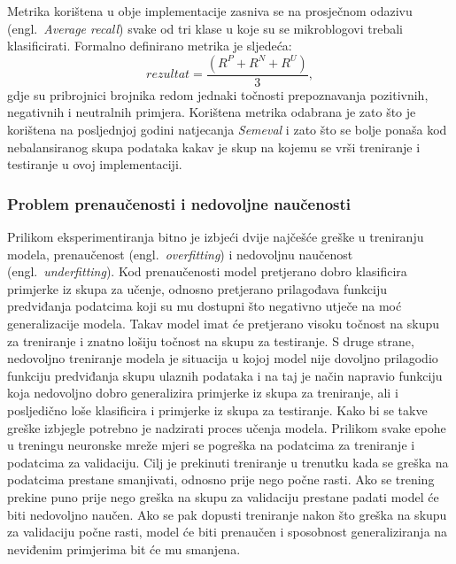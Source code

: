 \documentclass[times, utf8, zavrsni]{fer}
\begin{document}
Metrika korištena u obje implementacije zasniva se na prosječnom odazivu (engl.~\emph{Average recall}) svake od tri klase u koje su se mikroblogovi trebali klasificirati. Formalno definirano metrika je sljedeća: \[ \mathit{rezultat} = \frac{(R^P + R^N + R^U)}{3},\] gdje su pribrojnici brojnika redom jednaki točnosti prepoznavanja pozitivnih, negativnih i neutralnih primjera. Korištena metrika odabrana je zato što je korištena na posljednjoj godini natjecanja \emph{Semeval} i zato što se bolje ponaša kod nebalansiranog skupa podataka kakav je skup na kojemu se vrši treniranje i testiranje u ovoj implementaciji.

\subsubsection{Problem prenaučenosti i nedovoljne naučenosti}

Prilikom eksperimentiranja bitno je izbjeći dvije najčešće greške u treniranju modela, prenaučenost (engl.~\emph{overfitting}) i nedovoljnu naučenost (engl.~\emph{underfitting}). Kod prenaučenosti model pretjerano dobro klasificira primjerke iz skupa za učenje, odnosno pretjerano prilagođava funkciju predviđanja podatcima koji su mu dostupni što negativno utječe na moć generalizacije modela. Takav model imat će pretjerano visoku točnost na skupu za treniranje i znatno lošiju točnost na skupu za testiranje. S druge strane, nedovoljno treniranje modela je situacija u kojoj model nije dovoljno prilagodio funkciju predviđanja skupu ulaznih podataka i na taj je način napravio funkciju koja nedovoljno dobro generalizira primjerke iz skupa za treniranje, ali i posljedično loše klasificira i primjerke iz skupa za testiranje. Kako bi se takve greške izbjegle potrebno je nadzirati proces učenja modela. Prilikom svake epohe u treningu neuronske mreže mjeri se pogreška na podatcima za treniranje i podatcima za validaciju. Cilj je prekinuti treniranje u trenutku kada se greška na podatcima prestane smanjivati, odnosno prije nego počne rasti. Ako se trening prekine puno prije nego greška na skupu za validaciju prestane padati model će biti nedovoljno naučen. Ako se pak dopusti treniranje nakon što greška na skupu za validaciju počne rasti, model će biti prenaučen i sposobnost generaliziranja na neviđenim primjerima bit će mu smanjena. 
\end{document}
